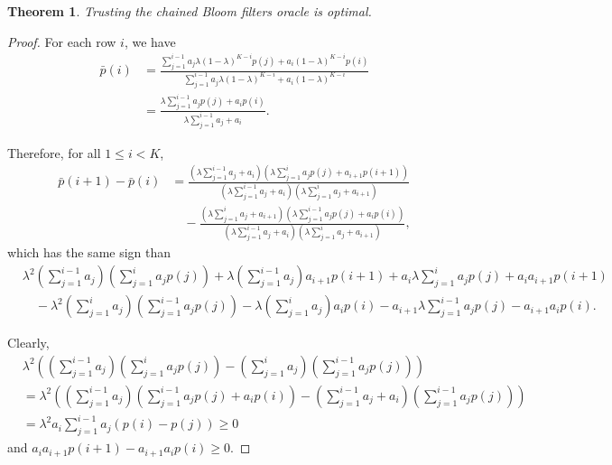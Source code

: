 \documentclass{article}
\newtheorem{theorem}{Theorem}
\begin{document}
\begin{theorem}
    Trusting the chained Bloom filters oracle is optimal.
\end{theorem}
\begin{proof}
    For each row \(i\), we have
    \begin{align*}
        \bar{p}(i)
        &=\frac{\sum_{j=1}^{i-1} a_j\lambda(1-\lambda)^{K-i}p(j)+a_i(1-\lambda)^{K-i}p(i)}{\sum_{j=1}^{i-1} a_j\lambda(1-\lambda)^{K-i}+a_i(1-\lambda)^{K-i}}\\
        &=\frac{\lambda \sum_{j=1}^{i-1}a_jp(j)+a_ip(i)}{\lambda \sum_{j=1}^{i-1}a_j+a_i}.
    \end{align*}

    Therefore, for all \(1\le i<K\),
    \begin{align*}
        \bar{p}(i+1)-\bar{p}(i)
        &=\frac{(\lambda \sum_{j=1}^{i-1}a_j+a_i)(\lambda \sum_{j=1}^{i}a_jp(j)+a_{i+1}p(i+1))}{(\lambda \sum_{j=1}^{i-1}a_j+a_i)(\lambda \sum_{j=1}^{i}a_j+a_{i+1})}\\
        &\quad-\frac{(\lambda \sum_{j=1}^{i}a_j+a_{i+1})(\lambda \sum_{j=1}^{i-1}a_jp(j)+a_ip(i))}{(\lambda \sum_{j=1}^{i-1}a_j+a_i)(\lambda \sum_{j=1}^{i}a_j+a_{i+1})},
    \end{align*}
    which has the same sign than
    \begin{align*}
        &\lambda^2\left(\sum_{j=1}^{i-1}a_j\right)\left(\sum_{j=1}^{i}a_jp(j)\right)+\lambda\left(\sum_{j=1}^{i-1}a_j\right)a_{i+1}p(i+1)+a_i\lambda \sum_{j=1}^{i}a_jp(j)+a_ia_{i+1}p(i+1)\\
        &\quad-\lambda^2\left(\sum_{j=1}^{i}a_j\right)\left(\sum_{j=1}^{i-1}a_jp(j)\right)-\lambda \left(\sum_{j=1}^{i}a_j\right)a_ip(i)-a_{i+1}\lambda \sum_{j=1}^{i-1}a_jp(j)-a_{i+1}a_ip(i).
    \end{align*}

    Clearly,
    \begin{align*}
        &\lambda^2\left(\left(\sum_{j=1}^{i-1}a_j\right)\left(\sum_{j=1}^{i}a_jp(j)\right)-\left(\sum_{j=1}^{i}a_j\right)\left(\sum_{j=1}^{i-1}a_jp(j)\right)\right)\\
        &=\lambda^2\left(\left(\sum_{j=1}^{i-1}a_j\right)\left(\sum_{j=1}^{i-1}a_jp(j)+a_ip(i)\right)-\left(\sum_{j=1}^{i-1}a_j+a_i\right)\left(\sum_{j=1}^{i-1}a_jp(j)\right)\right)\\
        &=\lambda^2a_i \sum_{j=1}^{i-1} a_j(p(i)-p(j))\ge 0
    \end{align*}
    and \(a_ia_{i+1}p(i+1)-a_{i+1}a_ip(i)\ge 0\).


\end{proof}
\end{document}
